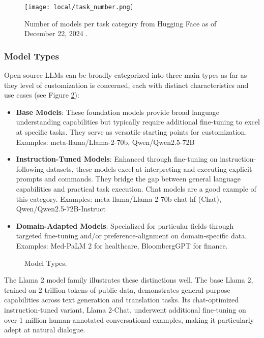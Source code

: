 \begin{figure}[H]
\centering
\texttt{[image: local/task\_number.png]}
\caption{Number of models per task category from Hugging Face as of December 22, 2024 \cite{hf2024yearinreview}.}
\label{fig:task_number}
\end{figure}

\subsubsection{Model Types}
 
Open source LLMs can be broadly categorized into three main types as far as they level of customization is concerned, each with distinct characteristics and use cases (see Figure \ref{fig:model_types}):

\begin{itemize}
    \item \textbf{Base Models}: These foundation models provide broad language understanding capabilities but typically require additional fine-tuning to excel at specific tasks. They serve as versatile starting points for customization. Examples: meta-llama/Llama-2-70b, Qwen/Qwen2.5-72B

    \item \textbf{Instruction-Tuned Models}: Enhanced through fine-tuning on instruction-following datasets, these models excel at interpreting and executing explicit prompts and commands. They bridge the gap between general language capabilities and practical task execution. Chat models are a good example of this category. Examples: meta-llama/Llama-2-70b-chat-hf (Chat), Qwen/Qwen2.5-72B-Instruct

    \item \textbf{Domain-Adapted Models}: Specialized for particular fields through targeted fine-tuning and/or preference-alignment on domain-specific data. Examples: Med-PaLM 2 for healthcare, BloombergGPT for finance.
\end{itemize}

\begin{figure}[H]
\centering

\caption{Model Types.}
\label{fig:model_types}
\end{figure}

The Llama 2 model family  illustrates these distinctions well. The base Llama 2, trained on 2 trillion tokens of public data, demonstrates general-purpose capabilities across text generation and translation tasks. Its chat-optimized instruction-tuned variant, Llama 2-Chat, underwent additional fine-tuning on over 1 million human-annotated conversational examples, making it particularly adept at natural dialogue.

